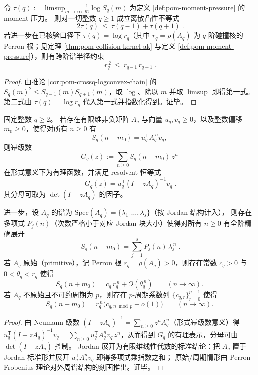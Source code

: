 \begin{corollary}\label{cor:pom-crossq-pressure-convexity}
令 \(\tau(q):=\limsup_{m\to\infty}\frac{1}{m}\log S_q(m)\) 为定义 \ref{def:pom-moment-pressure} 的 moment 压力。
则对一切整数 \(q\ge 1\) 成立离散凸性不等式
\[
\boxed{\;
2\tau(q)\ \le\ \tau(q-1)+\tau(q+1)\; }.
\]
若进一步在已核验口径下 \(\tau(q)=\log r_q\)（其中 \(r_q=\rho(A_q)\) 为 \(q\)-阶碰撞核的 Perron 根；见定理 \ref{thm:pom-collision-kernel-ak} 与定义 \ref{def:pom-moment-pressure}），则有跨阶谱半径约束
\[
\boxed{\;
r_q^{\,2}\ \le\ r_{q-1}\,r_{q+1}\; }.
\]
\end{corollary}
\begin{proof}
由推论 \ref{cor:pom-crossq-logconvex-chain} 的 \(S_q(m)^2\le S_{q-1}(m)S_{q+1}(m)\)，取 \(\log\)、除以 \(m\) 并取 \(\limsup\) 即得第一式。
第二式由 \(\tau(q)=\log r_q\) 代入第一式并指数化得到。证毕。
\end{proof}

\begin{proposition}\label{prop:pom-moment-genfunc-jordan}
固定整数 \(q\ge 2\)。
若存在有限维非负矩阵 \(A_q\) 与向量 \(u_q,v_q\ge 0\)，以及整数偏移 \(m_0\ge 0\)，使得对所有 \(n\ge 0\) 有
\[
S_q(n+m_0)=u_q^{\mathsf T}A_q^{\,n}v_q,
\]
则幂级数
\[
G_q(z):=\sum_{n\ge 0} S_q(n+m_0)\,z^n
\]
在形式意义下为有理函数，并满足 resolvent 恒等式
\[
\boxed{\;
G_q(z)=u_q^{\mathsf T}(I-zA_q)^{-1}v_q\; }.
\]
其分母可取为 \(\det(I-zA_q)\) 的因子。
\par
进一步，设 \(A_q\) 的谱为 \(\mathrm{Spec}(A_q)=\{\lambda_1,\dots,\lambda_s\}\)（按 Jordan 结构计入），
则存在多项式 \(P_j(n)\)（次数严格小于对应 Jordan 块大小）使得对所有 \(n\ge 0\) 有全阶精确展开
\[
\boxed{\;
S_q(n+m_0)=\sum_{j=1}^{s} P_j(n)\,\lambda_j^{\,n}\; }.
\]
若 \(A_q\) 原始（primitive），记 Perron 根 \(r_q=\rho(A_q)>0\)，则存在常数 \(c_q>0\) 与 \(0<\theta_q<r_q\) 使得
\[
S_q(n+m_0)=c_q\,r_q^{\,n}+O(\theta_q^{\,n})\qquad(n\to\infty).
\]
若 \(A_q\) 不原始且不可约周期为 \(p\)，则存在 \(p\)-周期系数列 \(\{c_{q,r}\}_{r=0}^{p-1}\) 使得
\[
S_q(n+m_0)=r_q^{\,n}\bigl(c_{q,n\bmod p}+o(1)\bigr)\qquad(n\to\infty).
\]
\end{proposition}
\begin{proof}
由 Neumann 级数 \((I-zA_q)^{-1}=\sum_{n\ge 0} z^nA_q^n\)（形式幂级数意义）得
\(
u_q^{\mathsf T}(I-zA_q)^{-1}v_q=\sum_{n\ge 0}u_q^{\mathsf T}A_q^n v_q\,z^n
\)，从而得到 \(G_q\) 的有理表示，分母可由 \(\det(I-zA_q)\) 控制。
Jordan 展开为有限维线性代数的标准结论：把 \(A_q\) 置于 Jordan 标准形并展开 \(u_q^{\mathsf T}A_q^{n}v_q\) 即得多项式乘指数之和；
原始/周期情形由 Perron--Frobenius 理论对外周谱结构的刻画推出。证毕。
\end{proof}

